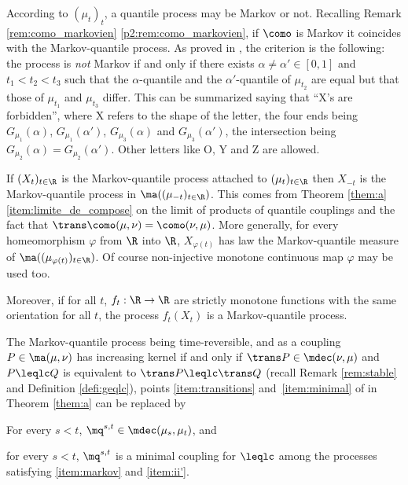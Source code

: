 \begin{ex}\label{ex:quantile}
According to $(\mu_t)_t$, a quantile process may be Markov or not. Recalling Remark \ref{rem:como_markovien} \eqref{p2:rem:como_markovien}, if $\como$ is Markov it coincides with the Markov-quantile process. As proved in \cite[Prop.\,3]{Ju_seminaire}, the criterion is the following: the process is \emph{not} Markov if and only if there exists $\alpha\neq \alpha'\in [0,1]$ and $t_1<t_2<t_3$ such that the $\alpha$-quantile and the $\alpha'$-quantile of $\mu_{t_2}$ are equal but that those of $\mu_{t_1}$ and $\mu_{t_3}$ differ. This can be summarized saying that ``X's are forbidden'', where X refers to the shape of the letter, the four ends being $G_{\mu_1}(\alpha)$, $G_{\mu_1}(\alpha')$, $G_{\mu_3}(\alpha)$ and $G_{\mu_3}(\alpha')$, the intersection being $G_{\mu_2}(\alpha)=G_{\mu_2}(\alpha')$. Other letters like O, Y and Z are allowed.
\end{ex}

\begin{rem}\label{ex:reversed}
If $(X_t)_{t\in \R}$ is the Markov-quantile process attached to $(\mu_t)_{t\in\R}$ then $X_{-t}$ is the Markov-quantile process in $\ma((\mu_{-t})_{t\in \R})$. This comes from Theorem \ref{them:a} \eqref{item:limite_de_compose} on the limit of products of quantile couplings and the fact that $\trans \como(\mu,\nu)=\como(\nu,\mu)$. More generally, for every homeomorphism $\varphi$ from $\R$ into $\R$, $X_{\varphi(t)}$ has law the Markov-quantile measure of $\ma((\mu_{\varphi(t)})_{t\in \R})$. Of course non-injective monotone continuous map $\varphi$ may be used too.

Moreover, if for all $t$, $f_t:\R\to \R$ are strictly monotone functions with the same orientation for all $t$, the process $f_t(X_t)$ is a Markov-quantile process.
\end{rem}

\begin{rem}
The Markov-quantile process being time-reversible, and as a coupling $P\in \ma(\mu,\nu)$ has increasing kernel if and only if $\trans P\in\mdec(\nu,\mu)$ and $P \leqlc Q$ is equivalent to $\trans P\leqlc \trans Q$ (recall Remark \ref{rem:stable} and Definition \ref{defi:geqlc}), points \eqref{item:transitions} and~\eqref{item:minimal} of in Theorem \ref{them:a} can be replaced by
\begin{enumeratei}\renewcommand{\theenumi}{\roman{enumi}'}
\item\label{item:ii'}
For every $s<t$, $\mq^{s,t}\in\mdec(\mu_s,\mu_t)$, and
\item\label{item:iii'}
for every $s<t$, $\mq^{s,t}$ is a minimal coupling for $\leqlc$ among the processes satisfying \eqref{item:markov} and \eqref{item:ii'}.
\end{enumeratei}
\end{rem}

